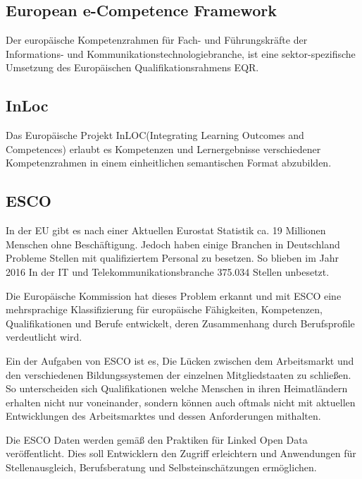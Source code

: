 \vspace{1em}

\subsection{European e-Competence Framework}\label{e-CF}

Der europäische Kompetenzrahmen für Fach- und Führungskräfte der Informations- und Kommunikationstechnologiebranche, ist eine sektor-spezifische  Umsetzung des Europäischen Qualifikationsrahmens EQR. 

\subsection{InLoc}\label{inloc}

Das Europäische Projekt InLOC(Integrating Learning Outcomes and Competences) erlaubt es Kompetenzen und Lernergebnisse verschiedener Kompetenzrahmen in einem einheitlichen semantischen Format abzubilden. 



\subsection{ESCO}

In der EU gibt es nach einer Aktuellen Eurostat Statistik ca. 19 Millionen Menschen ohne Beschäftigung. Jedoch haben einige Branchen in Deutschland Probleme Stellen mit qualifiziertem Personal zu besetzen. So blieben im Jahr 2016 In der IT und Telekommunikationsbranche 375.034 Stellen unbesetzt.\cite{Statista2016}
 
Die Europäische Kommission hat dieses Problem erkannt und mit ESCO eine mehrsprachige Klassifizierung für europäische Fähigkeiten, Kompetenzen, Qualifikationen und Berufe entwickelt, deren Zusammenhang durch Berufsprofile verdeutlicht wird.
 
Ein der Aufgaben von ESCO ist es, Die Lücken zwischen dem Arbeitsmarkt und den verschiedenen Bildungssystemen der einzelnen Mitgliedstaaten zu schließen. So unterscheiden sich Qualifikationen welche Menschen in ihren Heimatländern erhalten nicht nur voneinander, sondern können auch oftmals nicht mit aktuellen Entwicklungen des Arbeitsmarktes und dessen Anforderungen mithalten.

Die ESCO Daten werden gemäß den Praktiken für Linked Open Data veröffentlicht. Dies soll Entwicklern den Zugriff erleichtern und Anwendungen für Stellenausgleich, Berufsberatung und Selbsteinschätzungen ermöglichen.


